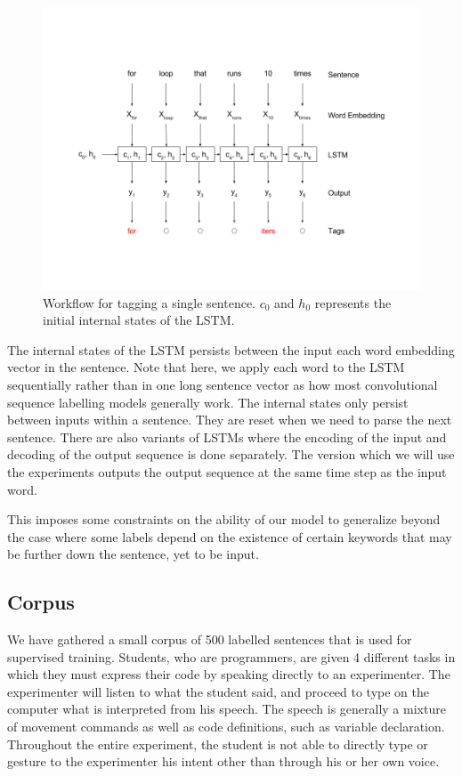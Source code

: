 \documentclass[fyp]{socreport}
\begin{document}
\begin{figure}[h]
\includegraphics[width=\textwidth]{Workflow.png}
\caption{Workflow for tagging a single sentence.
$c_0$ and $h_0$ represents the initial internal states of the LSTM.}
\centering
\end{figure}

The internal states of the LSTM persists between the input each word
embedding vector in the sentence. Note that here, we apply each word
to the LSTM sequentially rather than in one long sentence vector as
how most convolutional sequence labelling models generally work. The
internal states only persist between inputs within a sentence. They are
reset when we need to parse the next sentence. There are also variants
of LSTMs where the encoding of the input and decoding of the output
sequence is done separately. The version which we will use the experiments
outputs the output sequence at the same time step as the input word.

This imposes some constraints on the ability of our model to generalize beyond
the case where some labels depend on the existence of certain keywords
that may be further down the sentence, yet to be input.

\subsection{Corpus}
We have gathered a small corpus of 500 labelled sentences that is used for
supervised training. Students, who are programmers, are given 4 different tasks
in which they must express their code by speaking directly to an experimenter.
The experimenter will listen to what the student said, and proceed to type on
the computer what is interpreted from his speech. The speech is generally a mixture
of movement commands as well as code definitions, such as variable declaration.
Throughout the entire experiment, the student is not able to directly type or
gesture to the experimenter his intent other than through his or her own voice.
\end{document}
